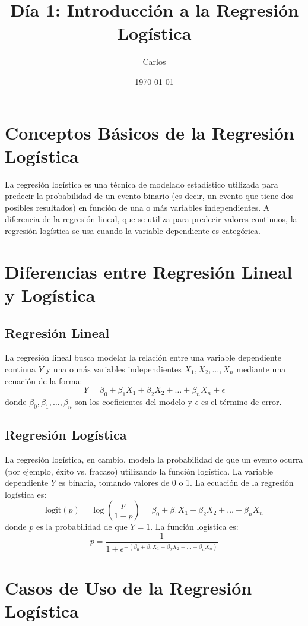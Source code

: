 \documentclass{article}
\title{Día 1: Introducción a la Regresión Logística}
\author{Carlos}
\date{\today}
\begin{document}
\maketitle

\section{Conceptos Básicos de la Regresión Logística}

La regresión logística es una técnica de modelado estadístico utilizada para predecir la probabilidad de un evento binario (es decir, un evento que tiene dos posibles resultados) en función de una o más variables independientes. A diferencia de la regresión lineal, que se utiliza para predecir valores continuos, la regresión logística se usa cuando la variable dependiente es categórica.

\section{Diferencias entre Regresión Lineal y Logística}

\subsection{Regresión Lineal}
La regresión lineal busca modelar la relación entre una variable dependiente continua $Y$ y una o más variables independientes $X_1, X_2, \ldots, X_n$ mediante una ecuación de la forma:
\[
Y = \beta_0 + \beta_1 X_1 + \beta_2 X_2 + \ldots + \beta_n X_n + \epsilon
\]
donde $\beta_0, \beta_1, \ldots, \beta_n$ son los coeficientes del modelo y $\epsilon$ es el término de error.

\subsection{Regresión Logística}
La regresión logística, en cambio, modela la probabilidad de que un evento ocurra (por ejemplo, éxito vs. fracaso) utilizando la función logística. La variable dependiente $Y$ es binaria, tomando valores de 0 o 1. La ecuación de la regresión logística es:
\[
\text{logit}(p) = \log\left(\frac{p}{1-p}\right) = \beta_0 + \beta_1 X_1 + \beta_2 X_2 + \ldots + \beta_n X_n
\]
donde $p$ es la probabilidad de que $Y=1$. La función logística es:
\[
p = \frac{1}{1 + e^{-(\beta_0 + \beta_1 X_1 + \beta_2 X_2 + \ldots + \beta_n X_n)}}
\]

\section{Casos de Uso de la Regresión Logística}
\end{document}
